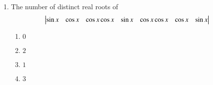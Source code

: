 \begin{enumerate}[label=\thesubsection.\arabic*,ref=\thesubsection.\theenumi]

    \item The number of distinct real roots of
    \begin{align*}
	    \begin{vmatrix}
		\sin{x}&\cos{x}&\cos{x}
    		\cos{x}&\sin{x}&\cos{x}
		\cos{x}&\cos{x}&\sin{x}\end{vmatrix}
    \end{align*}

        \hfill{}
        \begin{enumerate}
                \item $0$
                \item $2$
                \item $1$
                \item $3$
        \end{enumerate}


\end{enumerate}
